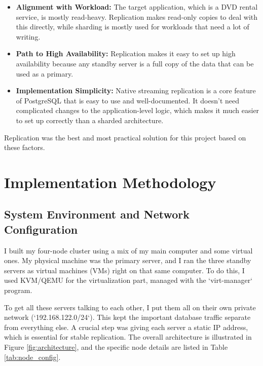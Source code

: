 \documentclass[conference]{IEEEtran}
\begin{document}
\begin{itemize}
    \item \textbf{Alignment with Workload:} The target application, which is a DVD rental service, is mostly read-heavy. Replication makes read-only copies to deal with this directly, while sharding is mostly used for workloads that need a lot of writing.

    \item \textbf{Path to High Availability:} Replication makes it easy to set up high availability because any standby server is a full copy of the data that can be used as a primary.
    \item \textbf{Implementation Simplicity:} Native streaming replication is a core feature of PostgreSQL that is easy to use and well-documented. It doesn't need complicated changes to the application-level logic, which makes it much easier to set up correctly than a sharded architecture.
\end{itemize}

Replication was the best and most practical solution for this project based on these factors. 


\section{Implementation Methodology}

\subsection{System Environment and Network Configuration}

I built my four-node cluster using a mix of my main computer and some virtual ones. My physical machine was the primary server, and I ran the three standby servers as virtual machines (VMs) right on that same computer. To do this, I used KVM/QEMU for the virtualization part, managed with the `virt-manager` program.

To get all these servers talking to each other, I put them all on their own private network (`192.168.122.0/24`). This kept the important database traffic separate from everything else. A crucial step was giving each server a static IP address, which is essential for stable replication. The overall architecture is illustrated in Figure \ref{fig:architecture}, and the specific node details are listed in Table \ref{tab:node_config}.
\end{document}
